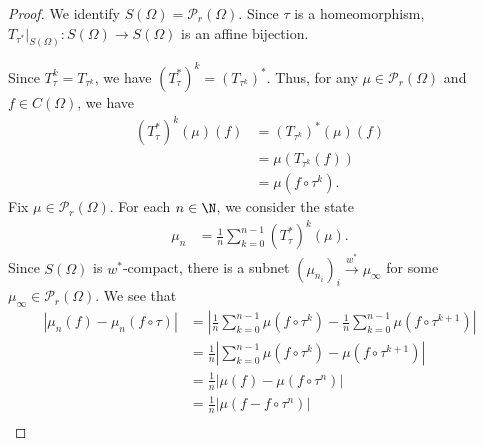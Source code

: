 \documentclass[10pt]{mypackage}
\begin{document}
\begin{proof}
  We identify $S\left(\Omega\right) = \mathcal{P}_{r}\left(\Omega\right)$. Since $\tau$ is a homeomorphism, $T_{\tau^{\ast}}|_{S\left(\Omega\right)}: S\left(\Omega\right)\rightarrow S\left(\Omega\right)$ is an affine bijection.\newline

  Since $T_{\tau}^{k} = T_{\tau^{k}}$, we have $\left(T_{\tau}^{\ast}\right)^{k} = \left(T_{\tau^k}\right)^{\ast}$. Thus, for any $\mu\in \mathcal{P}_{r}\left(\Omega\right)$ and $f\in C\left(\Omega\right)$, we have
  \begin{align*}
    \left(T_{\tau}^{\ast}\right)^{k}\left(\mu\right)\left(f\right) &= \left(T_{\tau^k}\right)^{\ast}\left(\mu\right)\left(f\right)\\
                                                                   &= \mu\left(T_{\tau^k}\left(f\right)\right)\\
                                                                   &= \mu\left(f\circ \tau^{k}\right).
  \end{align*}
  Fix $\mu\in \mathcal{P}_{r}\left(\Omega\right)$. For each $n\in \N$, we consider the state
  \begin{align*}
    \mu_{n} &= \frac{1}{n}\sum_{k=0}^{n-1}\left(T^{\ast}_{\tau}\right)^k\left(\mu\right).
  \end{align*}
  Since $S\left(\Omega\right)$ is $w^{\ast}$-compact, there is a subnet $\left(\mu_{n_i}\right)_{i}\xrightarrow{w^{\ast}}\mu_{\infty}$ for some $\mu_{\infty}\in \mathcal{P}_{r}\left(\Omega\right)$. We see that
  \begin{align*}
    \left\vert \mu_{n}\left(f\right) - \mu_{n}\left(f\circ \tau\right) \right\vert &= \left\vert \frac{1}{n}\sum_{k=0}^{n-1}\mu\left(f\circ \tau^k\right) - \frac{1}{n}\sum_{k=0}^{n-1}\mu\left(f\circ \tau^{k+1}\right) \right\vert\\
                                                                                   &= \frac{1}{n}\left\vert \sum_{k=0}^{n-1} \mu\left(f\circ \tau^k\right) - \mu\left(f\circ \tau^{k+1}\right)\right\vert\\
                                                                                   &= \frac{1}{n}\left\vert \mu\left(f\right) - \mu\left(f\circ \tau^{n}\right) \right\vert\\
                                                                                   &= \frac{1}{n}\left\vert \mu\left(f - f\circ \tau^{n}\right) \right\vert\\

\end{align*}
\end{proof}
\end{document}
